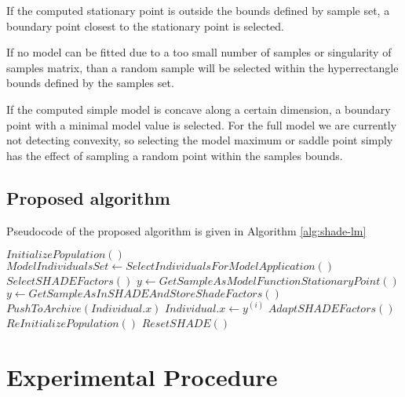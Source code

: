 \documentclass[sigconf]{acmart}
\begin{document}
If the computed stationary point is outside the bounds defined by sample set,
a boundary point closest to the stationary point is selected.

If no model can be fitted due to a too small number of samples or singularity of samples matrix,
than a random sample will be selected within the hyperrectangle bounds defined by the samples set.

If the computed simple model is concave along a certain dimension, a boundary point with a minimal model value is selected. For the full model we are currently not detecting convexity, so selecting the model maximum or saddle point simply
has the effect of sampling a random point within the samples bounds.

\subsection{Proposed algorithm}

Pseudocode of the proposed algorithm is given in Algorithm \ref{alg:shade-lm}

\begin{algorithm}[H]
	\begin{algorithmic}[1]
	\footnotesize
	\State $InitializePopulation()$
		\State $ModelIndividualsSet \gets SelectIndividualsForModelApplication()$
		\State $SelectSHADEFactors()$
				\State $y \gets GetSampleAsModelFunctionStationaryPoint()$
			\Else
				\State $y \gets GetSampleAsInSHADEAndStoreShadeFactors()$
			\EndIf
				\State $PushToArchive(Individual.x)$
				\State $Individual.x \gets y^{(i)}$
			\EndIf
		\EndFor
		\State $AdaptSHADEFactors()$
			\State $ReInitializePopulation()$
			\State $ResetSHADE()$
		\EndIf
	\EndWhile
	\caption{SHADE-LM pseudocode%
	\label{alg:shade-lm}}
	\end{algorithmic}
	\end{algorithm}
  

%
\section{Experimental Procedure}
\end{document}
